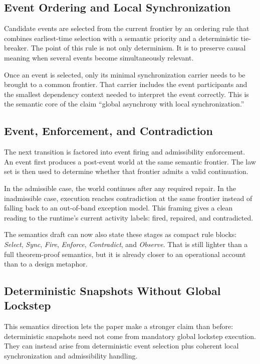 \subsection{Event Ordering and Local Synchronization}

Candidate events are selected from the current frontier by an ordering rule that combines earliest-time selection with a semantic priority and a deterministic tie-breaker.
The point of this rule is not only determinism.
It is to preserve causal meaning when several events become simultaneously relevant.

Once an event is selected, only its minimal synchronization carrier needs to be brought to a common frontier.
That carrier includes the event participants and the smallest dependency context needed to interpret the event correctly.
This is the semantic core of the claim ``global asynchrony with local synchronization.''

\subsection{Event, Enforcement, and Contradiction}

The next transition is factored into event firing and admissibility enforcement.
An event first produces a post-event world at the same semantic frontier.
The law set is then used to determine whether that frontier admits a valid continuation.

In the admissible case, the world continues after any required repair.
In the inadmissible case, execution reaches contradiction at the same frontier instead of falling back to an out-of-band exception model.
This framing gives a clean reading to the runtime's current activity labels: fired, repaired, and contradicted.

The semantics draft can now also state these stages as compact rule blocks:
\emph{Select}, \emph{Sync}, \emph{Fire}, \emph{Enforce}, \emph{Contradict}, and \emph{Observe}.
That is still lighter than a full theorem-proof semantics, but it is already closer to an operational account than to a design metaphor.

\subsection{Deterministic Snapshots Without Global Lockstep}

This semantics direction lets the paper make a stronger claim than before:
deterministic snapshots need not come from mandatory global lockstep execution.
They can instead arise from deterministic event selection plus coherent local synchronization and admissibility handling.


